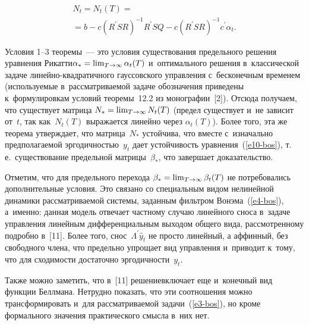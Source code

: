 \begin{multicols}{2}
\vspace*{-14pt}

\noindent
\begin{multline*}
N_t = N_t(T) ={}\\
{}= b - c\left(R^\prime SR\right)^{-1} R^\prime SQ -c\left( R^\prime 
SR\right)^{-1} c^\prime \alpha_t.
\end{multline*}

\vspace*{-4pt}

     
     Условия 1--3 теоремы~--- это условия существования предельного 
решения уравнения Рикатти\linebreak $\alpha_*\hm= \lim_{T\to\infty} \alpha_t(T)$ 
и~оптимального решения в~классической задаче  
ли\-ней\-но-квад\-ра\-тич\-но\-го гауссовского управления с~бесконечным 
временем (ис\-поль\-зу\-емые в~рас\-смат\-ри\-ва\-емой задаче обозначения приведены к~формулировкам условий тео\-ре\-мы~12.2 из монографии~[2]). Отсюда 
получаем, что существует мат\-ри\-ца $N_*\hm= \lim_{T\to \infty} N_t(T)$ 
(предел существует и~не зависит от~$t$, так как~$N_t(T)$ выражается 
линейно через $\alpha_t(T)$). Более того, эта же тео\-ре\-ма утверж\-да\-ет, что 
матрица~$N_*$ устойчива, что вместе с~изначально предполагаемой 
эргодичностью~$y_t$ дает устойчивость уравнения~(\ref{e10-bos}), т.\,е.\ 
существование предельной матрицы~$\beta_*$, что завершает 
до\-ка\-за\-тель\-ство.
     
     \smallskip
     
     Отметим, что для предельного перехода $\beta_*\hm= \lim_{T\to\infty} 
\beta_t(T)$ не потребовались дополнительные условия. Это связано со 
специальным видом нелинейной динамики рассматриваемой системы, 
заданным фильт\-ром Вонэма~(\ref{e4-bos}), а~именно: данная 
модель отвечает частному случаю линейного сноса в~задаче управления 
линейным дифференциальным выходом общего вида, рассмотренному 
подробно в~[11]. Более того, снос~$\Lambda^\prime \hat{y}_t$ не просто 
линейный, а аффинный, без свободного члена, что предельно упрощает вид 
управления и~приводит к~тому, что для сходимости достаточно 
эр\-го\-дич\-ности~$y_t$.

     
     Также можно заметить, что в~[11] решение\linebreak включает еще и~конечный 
вид функции Беллмана. Нетрудно показать, что эти соотношения \mbox{можно} 
трансформировать и~для рассматриваемой задачи~(\ref{e3-bos}), но кроме 
формального значения практического смысла в~них нет.
     

\end{multicols}
